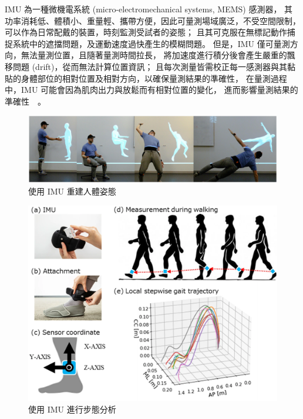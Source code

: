 IMU 為一種微機電系統 (micro-electromechanical systems, MEMS) 感測器，
其功率消耗低、體積小、重量輕、攜帶方便，因此可量測場域廣泛，不受空間限制，可以作為日常配戴的裝置，時刻監測受試者的姿態；
且其可克服在無標記動作捕捉系統中的遮擋問題，及運動速度過快產生的模糊問題。
但是，IMU 僅可量測方向，無法量測位置，且隨著量測時間拉長，
將加速度進行積分後會產生嚴重的飄移問題 (drift)，從而無法計算位置資訊；
且每次測量皆需校正每一感測器與其黏貼的身體部位的相對位置及相對方向，以確保量測結果的準確性，
在量測過程中，IMU 可能會因為肌肉出力與放鬆而有相對位置的變化，
進而影響量測結果的準確性~\cite{fiorentino2017soft}~\cite{stagni2005quantification}。

\begin{figure}[!ht]
    \centering
    \includegraphics[width=\linewidth]{figure/ch2_fig_IMU_pose_estimate.png}
     \caption[使用 IMU 重建人體姿態]{使用 IMU 重建人體姿態}
     \label{ch2_fig_IMU_pose_estimate}
\end{figure}

\begin{figure}[!ht]
    \centering
    \includegraphics[width=\linewidth]{figure/ch2_fig_IMU_gait_estimate.png}
     \caption[使用 IMU 進行步態分析]{使用 IMU 進行步態分析}
     \label{ch2_fig_IMU_gait_estimate}
\end{figure}

